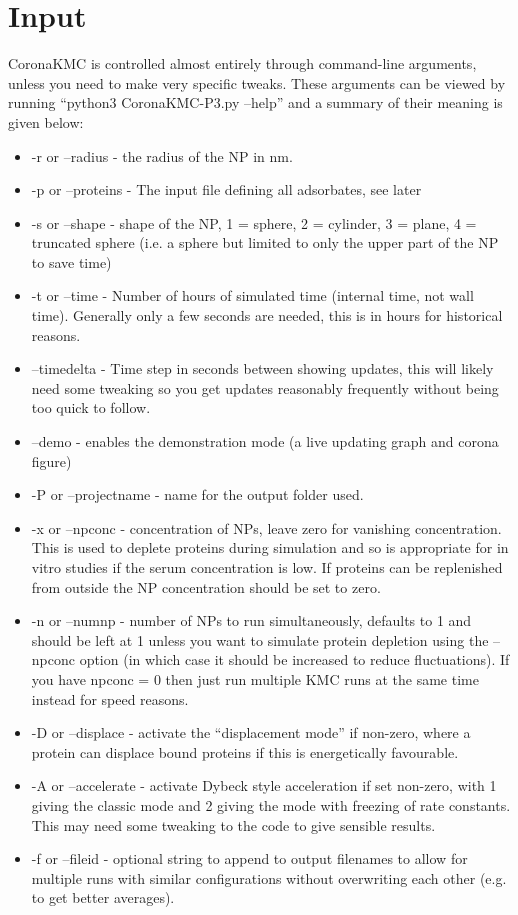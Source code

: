 \documentclass[10pt,a4paper,onecolumn]{report}
\begin{document}
 \section{Input}
CoronaKMC is controlled almost entirely through command-line arguments, unless you need to make very specific tweaks. These arguments can be viewed by running ``python3 CoronaKMC-P3.py --help'' and a summary of their meaning is given below:
 \begin{itemize}
 \item -r or --radius - the radius of the NP in nm. 
 \item -p or --proteins - The input file defining all adsorbates, see later
\item -s or --shape - shape of the NP,   1 = sphere, 2 = cylinder, 3 = plane, 4 = truncated sphere (i.e. a sphere but limited to only the upper part of the NP to save time)
\item -t or --time - Number of hours of simulated time (internal time, not wall time). Generally only a few seconds are needed, this is in hours for historical reasons.
\item --timedelta - Time step in seconds between showing updates, this will likely need some tweaking so you get updates reasonably frequently without being too quick to follow.
\item --demo - enables the demonstration mode (a live updating graph and corona figure)
\item -P or --projectname - name for the output folder used. 
\item -x or --npconc - concentration of NPs, leave zero for vanishing concentration. This is used to deplete proteins during simulation and so is appropriate for in vitro studies if the serum concentration is low. If proteins can be replenished from outside the NP concentration should be set to zero.
\item  -n or --numnp - number of NPs to run simultaneously, defaults to 1 and should be left at 1 unless you want to simulate protein depletion using the --npconc option (in which case it should be increased to reduce fluctuations). If you have npconc = 0 then just run multiple KMC runs at the same time instead for speed reasons.
\item  -D or --displace - activate the ``displacement mode'' if non-zero, where a protein can displace bound proteins if this is energetically favourable. 
\item -A or --accelerate - activate Dybeck style acceleration if set non-zero, with 1 giving the classic mode and 2 giving the mode with freezing of rate constants. This may need some tweaking to the code to give sensible results. 
\item -f or --fileid - optional string to append to output filenames to allow for multiple runs with similar configurations without overwriting each other (e.g. to get better averages).
\end{itemize}
\end{document}
